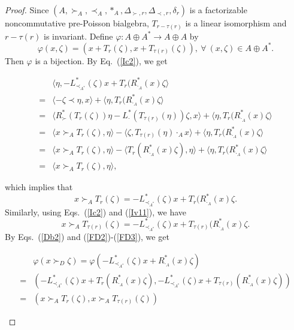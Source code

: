 \documentclass[12pt]{amsart}
\theoremstyle{definition}
\begin{document}
\begin{proof} Since $(A, \succ_{A},\prec_{A},\ast_{A}, \Delta_{\succ,r},  \Delta_{\prec,r},\delta_{r})$
 is a factorizable noncommutative pre-Poisson bialgebra,
$T_{r-\tau(r)}$ is a linear isomorphism and $r-\tau(r)$ is invariant.
Define $\varphi:A\oplus A^{*}\longrightarrow A\oplus A$ by
\begin{equation}\label{FD1}\varphi(x,\zeta)=(x+T_{r}(\zeta),x+T_{\tau(r)}(\zeta)),~\forall~(x,\zeta)\in A\oplus A^{*}.\end{equation}
Then $\varphi$ is a bijection.
By Eq.~(\ref{Ic2}), we get
\begin{small}
\begin{align*}&\langle\eta,-L_{\prec_{A^*}}^{*}(\zeta)x+T_{r}(R_{\cdot_A}^{*}(x)\zeta\rangle
\\=&\langle -\zeta\prec \eta ,x\rangle+\langle \eta,T_{r}(R_{\cdot_A}^{*}(x)\zeta\rangle
\\=&\langle R_{\succ}^{*}(T_{r}(\zeta))\eta-L_{\cdot}^{*} (T_{\tau(r)}(\eta))\zeta,x\rangle+\langle \eta,T_{r}(R_{\cdot_A}^{*}(x)\zeta\rangle
\\=&\langle x\succ_A T_{r}(\zeta),\eta\rangle-\langle \zeta,T_{\tau(r)}(\eta)\cdot_A x\rangle+\langle \eta,T_{r}(R_{\cdot_A}^{*}(x)\zeta\rangle
\\=&\langle x\succ_A T_{r}(\zeta),\eta\rangle-\langle T_{r}(R_{\cdot_A}^{*}(x)\zeta),\eta\rangle+\langle \eta,T_{r}(R_{\cdot_A}^{*}(x)\zeta\rangle
\\=&\langle x\succ_A T_{r}(\zeta),\eta\rangle,
\end{align*}\end{small}
which implies that
\begin{equation}\label{FD2}x\succ_{A} T_{r}(\zeta)=-L_{\prec_{A^*}}^{*}(\zeta)x+T_{r}(R_{\cdot_A}^{*}(x)\zeta.\end{equation}
Similarly, using Eqs.~(\ref{Ic2}) and (\ref{Iv11}), we have
\begin{equation}\label{FD3}x\succ_{A} T_{\tau(r)}(\zeta)=-L_{\prec_{A^*}}^{*}(\zeta)x+T_{\tau(r)}(R_{\cdot_A}^{*}(x)\zeta.\end{equation}
By Eqs.~(\ref{Db2}) and (\ref{FD2})-(\ref{FD3}), we get 
\begin{small}
\begin{align*}&\varphi(x\succ_D \zeta)=\varphi(-L_{\prec_{A^*}}^{*}(\zeta)x+R_{\cdot_A}^{*}(x)\zeta)
\\
=&(-L_{\prec_{A^*}}^{*}(\zeta)x+T_{r}(R_{\cdot_A}^{*}(x)\zeta),-L_{\prec_{A^*}}^{*}(\zeta)x+T_{\tau(r)}(R_{\cdot_A}^{*}(x)\zeta))
\\=&(x\succ_A T_{r}(\zeta),x\succ_A T_{\tau(r)}(\zeta))

\end{align*}
\end{small}
\end{proof}
\end{document}
